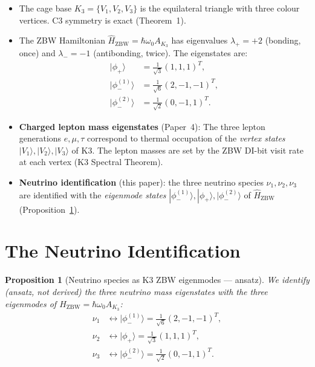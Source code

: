 \documentclass[11pt]{article}
\newtheorem{proposition}[theorem]{Proposition}
\newcommand{\ZBW}{\mathrm{ZBW}}
\begin{document}
\begin{itemize}
\item The cage base $K_3 = \{V_1,V_2,V_3\}$ is the equilateral triangle
  with three colour vertices.  C3 symmetry is exact (Theorem~1).

\item The ZBW Hamiltonian $\hat{H}_\ZBW = \hbar\omega_0 A_{K_3}$
  has eigenvalues $\lambda_+ = +2$ (bonding, once) and $\lambda_- = -1$
  (antibonding, twice).  The eigenstates are:
  \begin{align}
    |\phi_+\rangle &= \tfrac{1}{\sqrt{3}}(1,1,1)^T, \label{eq:phi+}\\
    |\phi_-^{(1)}\rangle &= \tfrac{1}{\sqrt{6}}(2,-1,-1)^T, \label{eq:phim1}\\
    |\phi_-^{(2)}\rangle &= \tfrac{1}{\sqrt{2}}(0,-1,1)^T. \label{eq:phim2}
  \end{align}

\item \textbf{Charged lepton mass eigenstates} (Paper~4): The three
  lepton generations $e, \mu, \tau$ correspond to thermal occupation
  of the \emph{vertex states} $|V_1\rangle, |V_2\rangle, |V_3\rangle$
  of K3.  The lepton masses are set by the ZBW DI-bit visit rate
  at each vertex (K3 Spectral Theorem).

\item \textbf{Neutrino identification} (this paper): the three neutrino
  species $\nu_1, \nu_2, \nu_3$ are identified with the \emph{eigenmode
  states} $|\phi_-^{(1)}\rangle, |\phi_+\rangle, |\phi_-^{(2)}\rangle$
  of $\hat{H}_\ZBW$ (Proposition~\ref{prop:nu_id}).
\end{itemize}

\section{The Neutrino Identification}

\begin{proposition}[Neutrino species as K3 ZBW eigenmodes --- ansatz]
\label{prop:nu_id}
We \emph{identify} (ansatz, not derived) the three neutrino mass
eigenstates with the three eigenmodes of $\hat{H}_\ZBW = \hbar\omega_0 A_{K_3}$:
\begin{align*}
\nu_1 &\leftrightarrow |\phi_-^{(1)}\rangle
  = \tfrac{1}{\sqrt{6}}(2,-1,-1)^T, \\
\nu_2 &\leftrightarrow |\phi_+\rangle
  = \tfrac{1}{\sqrt{3}}(1,1,1)^T, \\
\nu_3 &\leftrightarrow |\phi_-^{(2)}\rangle
  = \tfrac{1}{\sqrt{2}}(0,-1,1)^T.
\end{align*}
\end{proposition}
\end{document}
